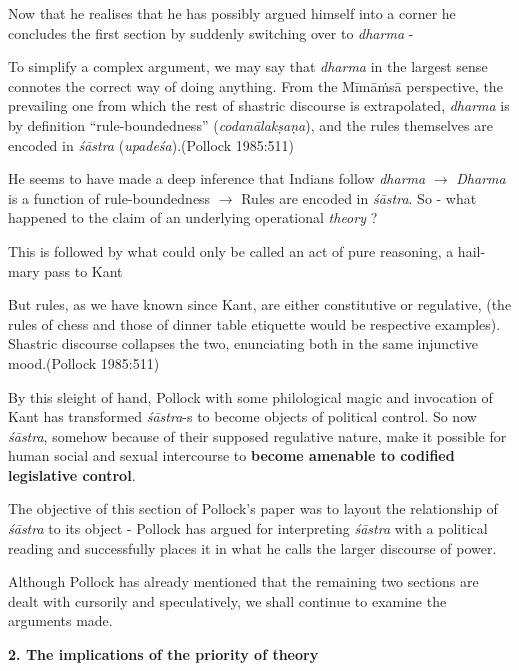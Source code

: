 Now that he realises that he has possibly argued himself into a corner he concludes the first section by suddenly switching over to {\sl dharma} -
\begin{myquote}
To simplify a complex argument, we may say that {\sl dharma} in the largest sense connotes the correct way of doing anything. From the Mīmāṁsā perspective, the prevailing one from which the rest of shastric discourse is extrapolated, {\sl dharma} is by definition ``rule-boundedness'' ({\sl codanālakṣaṇa}), and the rules themselves are encoded in {\sl śāstra} ({\sl upadeśa}).\hfill (Pollock 1985:511)
\end{myquote}

He seems to have made a deep inference that Indians follow {\sl dharma} $\to$ {\sl Dharma} is a function of rule-boundedness $\to$ Rules are encoded in {\sl śāstra}. So - what happened to the claim of an underlying operational {\sl theory} ?

This is followed by what could only be called an act of pure reasoning, a hail-mary pass to Kant
\begin{myquote}
But rules, as we have known since Kant, are either constitutive or regulative, (the rules of chess and those of dinner table etiquette would be respective examples). Shastric discourse collapses the two, enunciating both in the same injunctive mood.\hfill (Pollock 1985:511)
\end{myquote}

By this sleight of hand, Pollock with some philological magic and invocation of Kant has transformed {\sl śāstra}-s to become objects of political control. So now {\sl śāstra}, somehow because of their supposed regulative nature, make it possible for human social and sexual intercourse to {\bf become amenable to codified legislative control}.

The objective of this section of Pollock's paper was to layout the relationship of {\sl śāstra} to its object - Pollock has argued for interpreting {\sl śāstra} with a political reading and successfully places it in what he calls the larger discourse of power.

Although Pollock has already mentioned that the remaining two sections are dealt with cursorily and speculatively, we shall continue to examine the arguments made.

\noindent
{\bf 2. The implications of the priority of theory}

